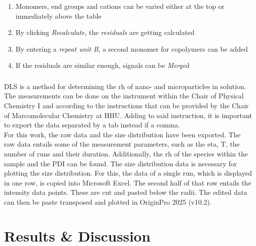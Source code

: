 \documentclass[11pt]{scrreport}
\begin{document}
\begin{enumerate}
\begin{enumerate}
\begin{enumerate}
\begin{enumerate}
					\item Monomers, end groups and cations can be varied either at the top or immediately above the table
					\item By clicking \textit{Recalculate}, the \textit{residuals} are getting calculated
					\item By entering a \textit{repeat unit B}, a second monomer for copolymers can be added
					\item If the residuals are similar enough, signals can be \textit{Merge}d
					\end{enumerate}
			\end{enumerate}
		\end{enumerate}
	\end{enumerate}
	\subsection{}
	\Gls{DLS} is a method for determining the \gls{rh} of nano- and microparticles in solution. The measurements can be done on the instrument within the Chair of Physical Chemistry I and according to the instructions that can be provided by the Chair of Marcomolecular Chemistry at \gls{HHU}. Adding to said instruction, it is important to export the data separated by a tab instead if a comma.\\
	For this work, the raw data and the size distribution have been exported. The raw data entails some of the measurement parameters, such as the \gls{eta}, \gls{T}, the number of runs and their duration. Additionally, the \gls{rh} of the species within the sample and the \gls{PDI} can be found. The size distribution data is necessary for plotting the size distribution. For this, the data of a single run, which is displayed in one row, is copied into Microsoft Excel. The second half of that row entails the intensity data points. These are cut and pasted below the radii. The edited data can then be paste transposed and plotted in OriginPro 2025 (v10.2).
	\chapter{Results \& Discussion}
\end{document}
